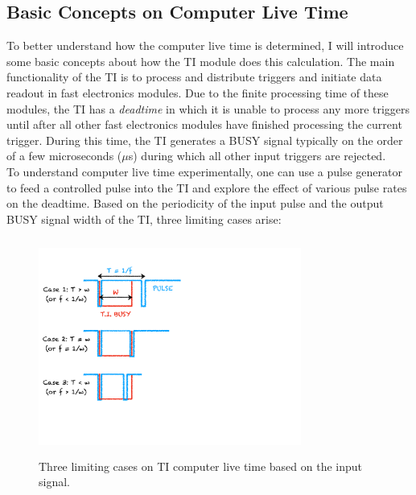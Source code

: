 \documentclass[letterpaper, 12 pt, conference]{ieeeconf}  %
\begin{document}
\subsection{Basic Concepts on Computer Live Time}
\noindent To better understand how the computer live time is determined, I will introduce some basic concepts about how the TI module does this calculation. The main functionality of the TI is to process and distribute triggers and initiate data readout in fast electronics modules. Due to the finite processing time of these modules, the TI has a \textit{deadtime} in which it is unable to process any more triggers until after all other fast electronics modules have finished processing the current trigger. During this time, the TI generates a BUSY signal typically on the order of a few microseconds ($\mu$s) during which
all other input triggers are rejected. \\
\indent To understand computer live time experimentally, one can use a pulse generator to feed a controlled pulse into the TI and explore the effect of
various pulse rates on the deadtime. Based on the periodicity of the input pulse and the output BUSY signal width of the TI, three limiting cases arise:
\begin{figure}[h!]
  \centering
  \includegraphics[width=3.4in, height=2.8in]{edtm/edtm_cases.pdf}
  \caption{Three limiting cases on TI computer live time based on the input signal.}
  \label{fig:edtm_cases}
\end{figure} \\
\end{document}
